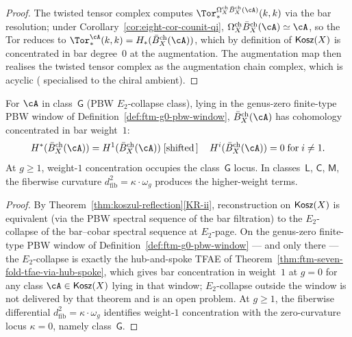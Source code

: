 \begin{proof}
The twisted tensor complex computes $\Tor^{\Omegach_X\Bbarch_X(\cA)}_{*}(k,k)$
via the bar resolution; under
Corollary~\ref{cor:eight-cor-counit-qi},
$\Omegach_X\Bbarch_X(\cA)\simeq\cA$, so the Tor reduces to
$\Tor^{\cA}_{*}(k,k)=H_{*}(\Bbarch_X(\cA))$, which by definition of
$\mathsf{Kosz}(X)$ is concentrated in bar degree~$0$ at the augmentation. The
augmentation map then realises the twisted tensor complex as the
augmentation chain complex, which is acyclic
(\cite[Theorem~2.4]{LV12} specialised to the chiral ambient).
\end{proof}

\begin{corollary}[Bar concentrated in weight~$1$ at $g=0$ on
class~$\mathsf{G}$; \ClaimStatusConditional]
\label{cor:eight-cor-bar-weight-1}
For $\cA$ in class~$\mathsf{G}$ (PBW $E_2$-collapse class), lying in
the genus-zero finite-type PBW window of
Definition~\ref{def:ftm-g0-pbw-window}, $\Bbarch_X(\cA)$ has
cohomology concentrated in bar weight~$1$:
\[
H^{*}(\Bbarch_X(\cA))=H^{1}(\Bbarch_X(\cA))\;[\text{shifted}\,]\,\quad
H^{i}(\Bbarch_X(\cA))=0\;\text{for}\;i\neq 1.
\]
At $g\geq 1$, weight-$1$ concentration occupies the
class~$\mathsf{G}$ locus.  In classes~$\mathsf{L}$, $\mathsf{C}$,
$\mathsf{M}$, the fiberwise curvature
$d^{2}_{\mathrm{fib}}=\kappa\cdot\omega_g$ produces the higher-weight
terms.
\end{corollary}

\begin{proof}
By Theorem~\ref{thm:koszul-reflection}\ref{KR-ii}, reconstruction on
$\mathsf{Kosz}(X)$ is equivalent (via the PBW spectral sequence of the bar
filtration) to the $E_2$-collapse of the
bar--cobar spectral sequence at $E_2$-page. On the genus-zero
finite-type PBW window of Definition~\ref{def:ftm-g0-pbw-window} ---
and only there --- the $E_2$-collapse is
exactly the hub-and-spoke TFAE of
Theorem~\ref{thm:ftm-seven-fold-tfae-via-hub-spoke}, which gives bar
concentration in weight~$1$ at $g=0$ for any class
$\cA\in\Kosz(X)$ lying in that window; $E_2$-collapse outside the
window is not delivered by that theorem and is an open problem.
At $g\geq 1$, the fiberwise differential
$d_{\mathrm{fib}}^{2}=\kappa\cdot\omega_g$ identifies weight-$1$
concentration with the zero-curvature locus $\kappa=0$, namely
class~$\mathsf{G}$.
\end{proof}

